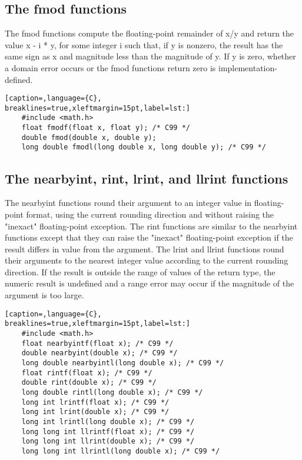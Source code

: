 \subsection{The fmod functions}
The fmod functions compute the floating-point remainder of x/y and return the
value x - i * y, for some integer i such that, if y is nonzero, the result has
the same sign as x and magnitude less than the magnitude of y. If y is zero,
whether a domain error occurs or the fmod functions return zero is
implementation-defined.

\lstset{basicstyle=\scriptsize, numbers=left, captionpos=b, tabsize=4}
\begin{lstlisting}[caption=,language={C},
breaklines=true,xleftmargin=15pt,label=lst:]
	#include <math.h>
	float fmodf(float x, float y); /* C99 */
	double fmod(double x, double y);
	long double fmodl(long double x, long double y); /* C99 */
\end{lstlisting}

\subsection{The nearbyint, rint, lrint, and llrint functions}
The nearbyint functions round their argument to an integer value in
floating-point format, using the current rounding direction and without raising
the "inexact" floating-point exception.  The rint functions are similar to the
nearbyint functions except that they can raise the "inexact" floating-point
exception if the result differs in value from the argument.  The lrint and
llrint functions round their arguments to the nearest integer value according
to the current rounding direction. If the result is outside the range of values
of the return type, the numeric result is undefined and a range error may occur
if the magnitude of the argument is too large.

\lstset{basicstyle=\scriptsize, numbers=left, captionpos=b, tabsize=4}
\begin{lstlisting}[caption=,language={C},
breaklines=true,xleftmargin=15pt,label=lst:]
	#include <math.h>
	float nearbyintf(float x); /* C99 */
	double nearbyint(double x); /* C99 */
	long double nearbyintl(long double x); /* C99 */
	float rintf(float x); /* C99 */
	double rint(double x); /* C99 */
	long double rintl(long double x); /* C99 */
	long int lrintf(float x); /* C99 */
	long int lrint(double x); /* C99 */
	long int lrintl(long double x); /* C99 */
	long long int llrintf(float x); /* C99 */
	long long int llrint(double x); /* C99 */
	long long int llrintl(long double x); /* C99 */
\end{lstlisting}

